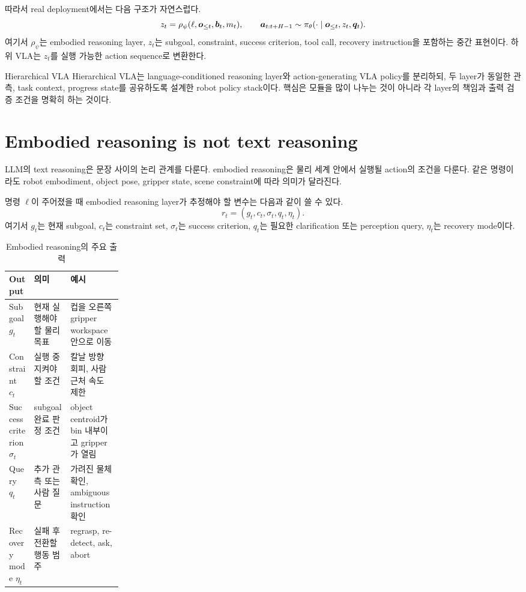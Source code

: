 따라서 real deployment에서는 다음 구조가 자연스럽다.
\begin{equation}
  z_t
  =
  \rho_{\psi}
  (\ell, \bm{o}_{\leq t}, \bm{b}_t, m_t),
  \qquad
  \bm{a}_{t:t+H-1}
  \sim
  \pi_{\theta}
  (\cdot \mid \bm{o}_{\leq t}, z_t, \bm{q}_t).
  \label{eq:ch17-reasoning-vla}
\end{equation}
여기서 $\rho_{\psi}$는 embodied reasoning layer, $z_t$는 subgoal, constraint, success criterion, tool call, recovery instruction을 포함하는 중간 표현이다. 하위 VLA는 $z_t$를 실행 가능한 action sequence로 변환한다.

\begin{definitionbox}{Hierarchical VLA}
Hierarchical VLA는 language-conditioned reasoning layer와 action-generating VLA policy를 분리하되, 두 layer가 동일한 관측, task context, progress state를 공유하도록 설계한 robot policy stack이다. 핵심은 모듈을 많이 나누는 것이 아니라 각 layer의 책임과 출력 검증 조건을 명확히 하는 것이다.
\end{definitionbox}

\section{Embodied reasoning is not text reasoning}

LLM의 text reasoning은 문장 사이의 논리 관계를 다룬다. embodied reasoning은 물리 세계 안에서 실행될 action의 조건을 다룬다. 같은 명령이라도 robot embodiment, object pose, gripper state, scene constraint에 따라 의미가 달라진다.

명령 $\ell$이 주어졌을 때 embodied reasoning layer가 추정해야 할 변수는 다음과 같이 쓸 수 있다.
\begin{equation}
  r_t
  =
  (
  g_t,
  c_t,
  \sigma_t,
  q_t,
  \eta_t
  ).
  \label{eq:ch17-reasoning-state}
\end{equation}
여기서 $g_t$는 현재 subgoal, $c_t$는 constraint set, $\sigma_t$는 success criterion, $q_t$는 필요한 clarification 또는 perception query, $\eta_t$는 recovery mode이다.

\begin{table}[h]
  \centering
  \caption{Embodied reasoning의 주요 출력}
  \begin{tabularx}{\linewidth}{p{0.22\linewidth}X X}
    \toprule
    Output & 의미 & 예시 \\
    \midrule
    Subgoal $g_t$ & 현재 실행해야 할 물리 목표 & 컵을 오른쪽 gripper workspace 안으로 이동 \\
    Constraint $c_t$ & 실행 중 지켜야 할 조건 & 칼날 방향 회피, 사람 근처 속도 제한 \\
    Success criterion $\sigma_t$ & subgoal 완료 판정 조건 & object centroid가 bin 내부이고 gripper가 열림 \\
    Query $q_t$ & 추가 관측 또는 사람 질문 & 가려진 물체 확인, ambiguous instruction 확인 \\
    Recovery mode $\eta_t$ & 실패 후 전환할 행동 범주 & regrasp, re-detect, ask, abort \\
    \bottomrule
  \end{tabularx}
  \label{tab:ch17-er-output}
\end{table}

